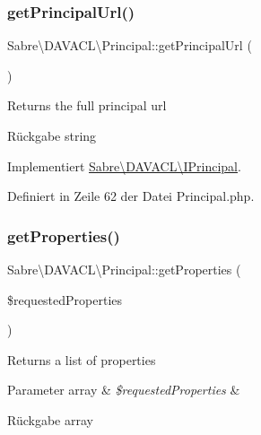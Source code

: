 \subsubsection{\texorpdfstring{get\+Principal\+Url()}{getPrincipalUrl()}}
{\footnotesize\ttfamily Sabre\textbackslash{}\+D\+A\+V\+A\+C\+L\textbackslash{}\+Principal\+::get\+Principal\+Url (\begin{DoxyParamCaption}{ }\end{DoxyParamCaption})}

Returns the full principal url

\begin{DoxyReturn}{Rückgabe}
string 
\end{DoxyReturn}


Implementiert \mbox{\hyperlink{interface_sabre_1_1_d_a_v_a_c_l_1_1_i_principal_ae3fc8f13f54eb5daba7416068c685298}{Sabre\textbackslash{}\+D\+A\+V\+A\+C\+L\textbackslash{}\+I\+Principal}}.



Definiert in Zeile 62 der Datei Principal.\+php.

\mbox{\label{class_sabre_1_1_d_a_v_a_c_l_1_1_principal_ac6b4a0da6c62db2d022ae1d413fa7e71}} 
\subsubsection{\texorpdfstring{get\+Properties()}{getProperties()}}
{\footnotesize\ttfamily Sabre\textbackslash{}\+D\+A\+V\+A\+C\+L\textbackslash{}\+Principal\+::get\+Properties (\begin{DoxyParamCaption}\item[{}]{\$requested\+Properties }\end{DoxyParamCaption})}

Returns a list of properties


\begin{DoxyParams}[1]{Parameter}
array & {\em \$requested\+Properties} & \\
\hline
\end{DoxyParams}
\begin{DoxyReturn}{Rückgabe}
array 
\end{DoxyReturn}


